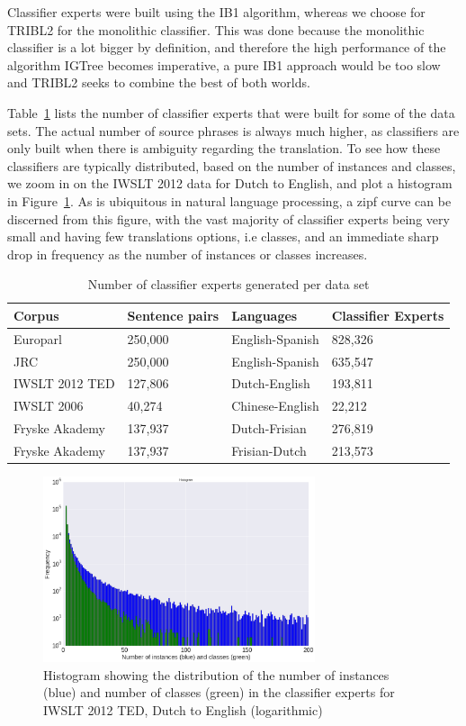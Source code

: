 \documentclass[smallextended]{svjour3}       %
\theoremstyle{break}
\begin{document}
Classifier experts were built using the IB1 algorithm, whereas we choose for
TRIBL2 for the monolithic classifier. This was done because the monolithic
classifier is a lot bigger by definition, and therefore the high performance of
the algorithm IGTree becomes imperative, a pure IB1 approach would be too slow
and TRIBL2 seeks to combine the best of both worlds.

Table~\ref{tab:expertcount} lists the number of classifier experts that were
built for some of the data sets. The actual number of source phrases is always
much higher, as classifiers are only built when there is ambiguity regarding
the translation. To see how these classifiers are typically distributed, based
on the number of instances and classes, we zoom in on the IWSLT 2012 data for
Dutch to English, and plot a histogram in Figure~\ref{fig:histogram}. As is
ubiquitous in natural language processing, a zipf curve can be discerned from
this figure, with the vast majority of classifier experts being very small and
having few translations options, i.e classes, and an immediate sharp drop in
frequency as the number of instances or classes increases.

\begin{table}
\begin{tabular}{|lll|l|}
\hline
\textbf{Corpus} & \textbf{Sentence pairs} & \textbf{Languages} & \textbf{Classifier Experts} \\
\hline
Europarl & 250,000 & English-Spanish & 828,326 \\
JRC & 250,000 & English-Spanish & 635,547 \\
IWSLT 2012 TED & 127,806 & Dutch-English & 193,811 \\
IWSLT 2006 & 40,274 & Chinese-English & 22,212 \\
Fryske Akademy & 137,937 & Dutch-Frisian & 276,819 \\
Fryske Akademy & 137,937 & Frisian-Dutch & 213,573 \\
\hline
\end{tabular}
\caption{Number of classifier experts generated per data set}
\label{tab:expertcount}
\end{table}


\begin{figure}
\includegraphics[width=80.00mm]{classifierhistogram.png}
\caption{Histogram showing the distribution of the number of instances (blue) and number of classes (green) in the classifier experts for IWSLT 2012 TED, Dutch to English (logarithmic)}
\label{fig:histogram}
\end{figure}
\end{document}

